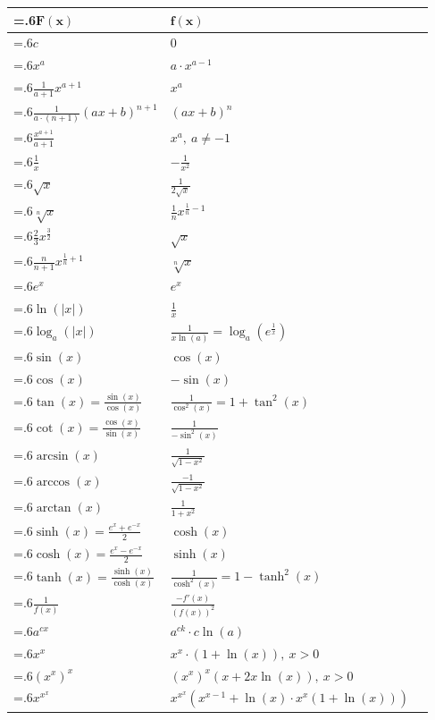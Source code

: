 \documentclass[a4paper, 10pt]{article}
\theoremstyle{definition}
\theoremstyle{named}
\begin{document}
\begin{tabularx}{\linewidth}{>{\hsize=.6\hsize\centering\arraybackslash}X|>{\centering\arraybackslash}XX}
    $\mathbf{F(x)}$ & $\mathbf{f(x)}$ \\
    \midrule
    $c$ & $0$ \\
    $x^a$ & $a \cdot x^{a - 1}$ \\
    $\frac{1}{a+1} x^{a + 1}$ & $x^a$ \\
    $\frac{1}{a \cdot (n + 1)} (ax + b)^{n + 1}$ & $(ax + b)^n$ \\
    $\frac{x^{a + 1}}{a + 1}$ & $x^a, \ a \neq -1$ \\
    $\frac{1}{x}$ & $-\frac{1}{x^2}$ \\
    $\sqrt{x}$ & $\frac{1}{2\sqrt{x}}$ \\
    $\sqrt[n]{x}$ & $\frac{1}{n}x^{\frac{1}{n} - 1}$ \\
    $\frac{2}{3}x^{\frac{3}{2}}$ & $\sqrt{x}$ \\
    $\frac{n}{n+1} x^{\frac{1}{n} + 1}$ & $\sqrt[n]{x}$ \\
    $e^x$ & $e^x$ \\
    $\ln(|x|)$ & $\frac{1}{x}$ \\
    $\log_a(|x|)$ & $\frac{1}{x \ln(a)} = \log_a(e^\frac{1}{x})$ \\
    $\sin(x)$ & $\cos(x)$ \\
    $\cos(x)$ & $-\sin(x)$ \\
    $\tan(x) = \frac{\sin(x)}{\cos(x)}$ & $\frac{1}{\cos^2(x)} = 1 + \tan^2(x)$ \\
    $\cot(x) = \frac{\cos(x)}{\sin(x)}$ & $\frac{1}{-\sin^2(x)}$ \\
    $\arcsin(x)$ & $\frac{1}{\sqrt{1 - x^2}}$ \\
    $\arccos(x)$ & $\frac{-1}{\sqrt{1 - x^2}}$ \\
    $\arctan(x)$ & $\frac{1}{1 + x^2}$ \\
    $\sinh(x) = \frac{e^x + e^{-x}}{2}$ & $\cosh(x)$ \\
    $\cosh(x) = \frac{e^x - e^{-x}}{2}$ & $\sinh(x)$ \\
    $\tanh(x) = \frac{\sinh(x)}{\cosh(x)}$ & $\frac{1}{\cosh^2(x)} = 1 - \tanh^2(x)$ \\
    $\frac{1}{f(x)}$ & $\frac{-f'(x)}{(f(x))^2}$ \\
    $a^{cx}$ & $a^{ck} \cdot c \ln(a)$ \\
    $x^x$ & $x^x \cdot (1 + \ln(x)), \ x > 0$ \\
    $(x^x)^x$ & $(x^x)^x (x + 2x \ln(x)), \ x > 0$ \\
    $x^{x^x}$ & $x^{x^x} (x^{x - 1} + \ln(x) \cdot x^x (1 + \ln(x)))$ \\
\end{tabularx}
\end{document}
